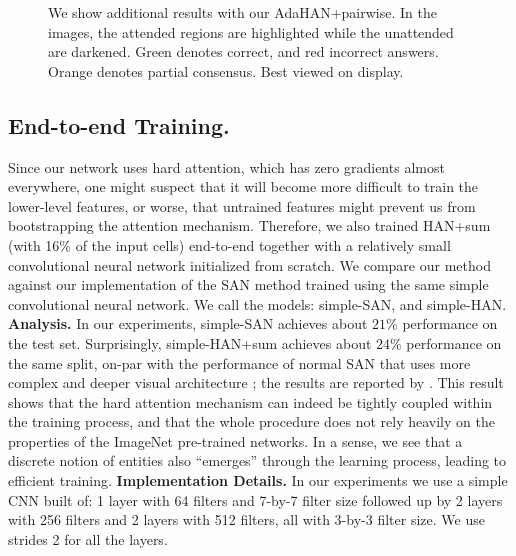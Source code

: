 \begin{figure*}[p]
\begin{center}
\begin{tabular}{l@{\ }l@{\ }c@{\ }c@{\ }c@{\ }c}
\end{tabular}
\end{center}
\caption{
We show additional results with our AdaHAN+pairwise. In the images, the attended regions are highlighted while the unattended are darkened. Green denotes correct, and red incorrect answers. Orange denotes partial consensus. Best viewed on display.
}
\label{fig:qualitative2}
\end{figure*}

\def\arraystretch{1.2}


\subsection{End-to-end Training.}
\label{sec:end2end_training}
Since our network uses hard attention, which has zero gradients almost everywhere, one might suspect that it will become more difficult to train the lower-level features, or worse, that untrained features might prevent us from bootstrapping the attention mechanism.
Therefore, we also trained HAN+sum (with 16\% of the input cells) end-to-end together with a relatively small convolutional neural network initialized from scratch.  
We compare our method against our implementation of the SAN method trained using the same simple convolutional neural network. 
We call the models: simple-SAN, and simple-HAN.
\newline
\noindent \textbf{Analysis.}
In our experiments, simple-SAN achieves about $21\%$ performance on the test set. Surprisingly, simple-HAN+sum achieves about $24\%$ performance on the same split, on-par with the performance of normal SAN that uses more complex and deeper visual architecture \cite{simonyan2014very}; the results are reported by \cite{agrawal2017don}. This result shows that the hard attention mechanism can indeed be tightly coupled within the training process, and that the whole procedure does not rely heavily on the properties of the ImageNet pre-trained networks.
In a sense, we see that a discrete notion of entities also ``emerges'' through the learning process, leading to efficient training.
\newline
\noindent \textbf{Implementation Details.}
In our experiments we use a simple CNN built of: 1 layer with 64 filters and 7-by-7 filter size followed up by 2 layers with 256 filters and 2 layers with 512 filters, all with 3-by-3 filter size. We use strides 2 for all the layers. 
